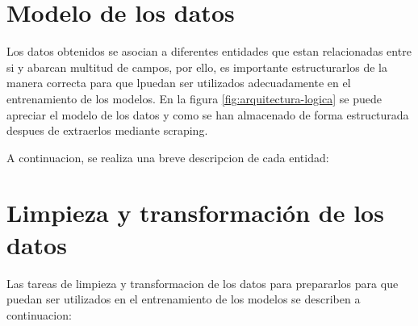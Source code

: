 \section{Modelo de los datos}
Los datos obtenidos se asocian a diferentes entidades que estan relacionadas entre si y abarcan multitud de campos, por ello, es importante estructurarlos de la manera correcta para que lpuedan ser utilizados adecuadamente en el entrenamiento de los modelos. En la figura \ref{fig:arquitectura-logica} se puede apreciar el modelo de los datos y como se han almacenado de forma estructurada despues de extraerlos mediante scraping.



A continuacion, se realiza una breve descripcion de cada entidad:

\section{Limpieza y transformación de los datos}
Las tareas de limpieza y transformacion de los datos para prepararlos para que puedan ser utilizados en el entrenamiento de los modelos se describen a continuacion:


